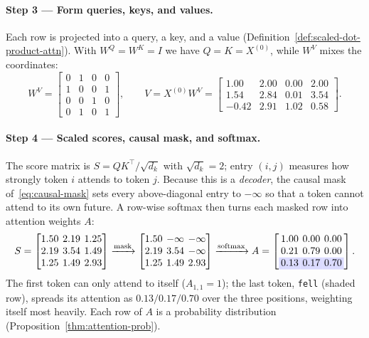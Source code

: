 \begin{deepdive}
\paragraph{Step 3 --- Form queries, keys, and values.}
Each row is projected into a query, a key, and a value
(Definition~\ref{def:scaled-dot-product-attn}).  With $W^Q = W^K = I$ we have
$Q = K = X^{(0)}$, while $W^V$ mixes the coordinates:
\begin{equation*}
  W^V =
  \begin{bmatrix}
    0 & 1 & 0 & 0\\
    1 & 0 & 0 & 1\\
    0 & 0 & 1 & 0\\
    0 & 1 & 0 & 1
  \end{bmatrix},
  \qquad
  V = X^{(0)} W^V =
  \begin{bmatrix}
    1.00 & 2.00 & 0.00 & 2.00\\
    1.54 & 2.84 & 0.01 & 3.54\\
    -0.42 & 2.91 & 1.02 & 0.58
  \end{bmatrix}.
\end{equation*}

\paragraph{Step 4 --- Scaled scores, causal mask, and softmax.}
The score matrix is $S = QK^{\top}/\sqrt{d_k}$ with $\sqrt{d_k} = 2$; entry $(i,j)$
measures how strongly token $i$ attends to token $j$.  Because this is a
\emph{decoder}, the causal mask of~\eqref{eq:causal-mask} sets every above-diagonal
entry to $-\infty$ so that a token cannot attend to its own future.  A row-wise
softmax then turns each masked row into attention weights $A$:
\begin{equation*}
  \setlength{\arraycolsep}{2pt}
  S =
  \begin{bmatrix}
    1.50 & 2.19 & 1.25\\
    2.19 & 3.54 & 1.49\\
    1.25 & 1.49 & 2.93
  \end{bmatrix}
  \xrightarrow{\text{mask}}
  \begin{bmatrix}
    1.50 & -\infty & -\infty\\
    2.19 & 3.54 & -\infty\\
    1.25 & 1.49 & 2.93
  \end{bmatrix}
  \xrightarrow{\text{softmax}}
  A =
  \left[\begin{array}{ccc}
    1.00 & 0.00 & 0.00\\
    0.21 & 0.79 & 0.00\\
    \rowcolor{blue!14} 0.13 & 0.17 & 0.70
  \end{array}\right].
\end{equation*}
The first token can only attend to itself ($A_{1,1} = 1$); the last token,
\texttt{fell} (shaded row), spreads its attention as $0.13/0.17/0.70$ over the three
positions, weighting itself most heavily.  Each row of $A$ is a probability distribution
(Proposition~\ref{thm:attention-prob}).


\end{deepdive}

